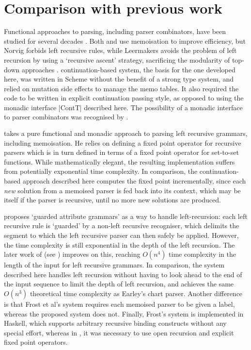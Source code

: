 \section{Comparison with previous work}
\label{s:comparison}

Functional approaches to parsing, including parser combinators,
have been studied
for several decades \cite{Burge1975,Fairbairn1987,FrostLaunchbury1989,Hutton1990}. Both \citet{Norvig1991}
and \citet{Leermakers1993} use memoisation to improve efficiency, but Norvig
forbids left recursive rules, while Leermakers avoids the problem of left recursion
by using a `recursive ascent' strategy, sacrificing the modularity of top-down approaches
\cite{Koskimies1990}.  continuation-based system,
the basis for the one developed here,
was written in Scheme without the benefit of a strong type system, and relied
on mutation side effects to manage the memo tables. It also required 
the code to be written in explicit continuation passing style, as opposed 
to using the monadic interface |ContT| described here. The possibility of a monadic interface to
parser combinators was recognised by \citet{Wadler1990}.

\citet{Lickman1995} takes a pure functional and monadic approach to parsing left recursive
grammars, including memoisation. He relies on defining a fixed point operator for recursive
parsers which is in turn defined in terms of a fixed point operator for set-to-set functions. While
mathematically elegant, the resulting implementation suffers from potentially exponential time 
complexity. In comparison, the continuation-based approach
described here computes the fixed point incrementally, since each \emph{new} 
solution from a memoised parser is fed back into its context, which may be itself if the parser is
recursive, until no more new solutions are produced.

\citet{Frost1993} proposes `guarded attribute grammars' as a way to handle
left-recursion: each left recursive rule is `guarded' by a non-left recursive recogniser,
which delimits the segment to which the left recursive parser can then safely be applied.
However, the time complexity is still exponential in the depth of the 
left recursion.
The later work of \citet{FrostHafiz2006} (see ) improves on this, reaching $O(n^4)$
time complexity in the length of the input for left recursive grammars. In comparison, the system 
described here handles left recursion without having to look ahead to the end of the input sequence 
to limit the depth of left recursion, and achieves the same $O(n^3)$ theoretical time complexity 
as Earley's chart parser. 
Another difference is that Frost et al's system
requires each memoised parser to be given a label, whereas the proposed system does not. Finally,
Frost's system is implemented in Haskell, which supports
arbitrary recursive binding constructs without any special effort, whereas in \OCaml, it was
necessary to use open recursion and explicit fixed point operators.

